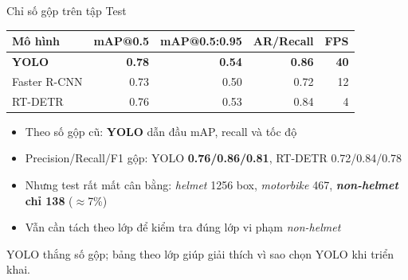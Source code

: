 \begin{frame}{Chỉ số gộp trên tập Test}

\begin{table}
\small
\begin{tabular}{lrrrr}
  \toprule
  \textbf{Mô hình} & \textbf{mAP@0.5} & \textbf{mAP@0.5:0.95} & \textbf{AR/Recall} & \textbf{FPS} \\
  \midrule
  \textbf{YOLO}    & \textbf{0.78} & \textbf{0.54} & \textbf{0.86} & \textbf{40} \\
  Faster R-CNN     & 0.73          & 0.50          & 0.72          & 12 \\
  RT-DETR          & 0.76          & 0.53          & 0.84          & 4  \\
  \bottomrule
\end{tabular}
\end{table}

\vspace{0.4em}
\begin{itemize}\small
  \item Theo số gộp cũ: \textbf{YOLO} dẫn đầu mAP, recall và tốc độ
  \item Precision/Recall/F1 gộp: YOLO \textbf{0.76/0.86/0.81}, RT-DETR 0.72/0.84/0.78
  \item Nhưng test rất mất cân bằng: \textit{helmet} 1256 box, \textit{motorbike} 467, \textbf{\textit{non-helmet} chỉ 138} ($\approx$7\%)
  \item Vẫn cần tách theo lớp để kiểm tra đúng lớp vi phạm \textit{non-helmet}
\end{itemize}

\vspace{0.2em}
\begin{alertblock}{}\small
  \centering YOLO thắng số gộp; bảng theo lớp giúp giải thích vì sao chọn YOLO khi triển khai.
\end{alertblock}

\end{frame}

